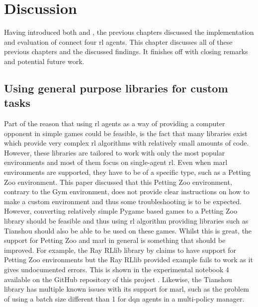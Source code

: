 \chapter{Discussion}
\label{ch:discussion}

Having introduced both  and , the previous chapters discussed the implementation and evaluation of connect four \gls{rl} agents.
This chapter discusses all of these previous chapters and the discussed findings.
It finishes off with closing remarks and potential future work.


\section{Using general purpose libraries for custom tasks}
\label{sec:discussion-library_support}

Part of the reason that using \gls{rl} agents as a way of providing a computer opponent in simple games could be feasible, is the fact that many libraries exist which provide very complex \gls{rl} algorithms with relatively small amounts of code.
However, these libraries are tailored to work with only the most popular environments and most of them focus on single-agent \gls{rl}.
Even when \gls{marl} environments are supported, they have to be of a specific type, such as a Petting Zoo environment.
This paper discussed that this Petting Zoo environment, contrary to the Gym environment, does not provide clear instructions on how to make a custom environment and thus some troubleshooting is to be expected.
However, converting relatively simple Pygame based games to a Petting Zoo library should be feasible and thus using \gls{rl} algorithm providing libraries such as Tianshou should also be able to be used on these games.
Whilst this is great, the support for Petting Zoo and \gls{marl} in general is something that should be improved.
For example, the Ray RLlib library by \citet{rllib} claims to have support for Petting Zoo environments but the Ray RLlib provided example fails to work as it gives undocumented errors.
This is shown in the experimental notebook 4 available on the GitHub repository of this project \citep{github_project}.
Likewise, the Tianshou library has multiple known issues with its support for \gls{marl}, such as the problem of using a batch size different than 1 for \gls{dqn} agents in a multi-policy manager.




